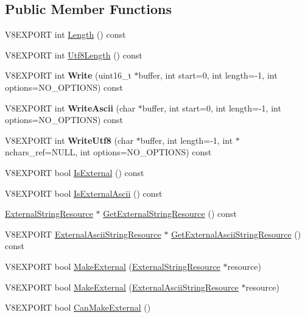 \subsection*{Public Member Functions}
\begin{DoxyCompactItemize}
\item 
V8\+E\+X\+P\+O\+R\+T int \hyperlink{classv8_1_1_string_a812edd5c3beffb3a08ff94103ac31f23}{Length} () const 
\item 
V8\+E\+X\+P\+O\+R\+T int \hyperlink{classv8_1_1_string_a11d12cdcd49afe5a8bb12646fd8ec17a}{Utf8\+Length} () const 
\item 
\hypertarget{classv8_1_1_string_acb1144b0652bc44345bf2d52b1455c05}{}V8\+E\+X\+P\+O\+R\+T int {\bfseries Write} (uint16\+\_\+t $\ast$buffer, int start=0, int length=-\/1, int options=N\+O\+\_\+\+O\+P\+T\+I\+O\+N\+S) const \label{classv8_1_1_string_acb1144b0652bc44345bf2d52b1455c05}

\item 
\hypertarget{classv8_1_1_string_af60c183b13ca1caebc7ea5d4bde593e6}{}V8\+E\+X\+P\+O\+R\+T int {\bfseries Write\+Ascii} (char $\ast$buffer, int start=0, int length=-\/1, int options=N\+O\+\_\+\+O\+P\+T\+I\+O\+N\+S) const \label{classv8_1_1_string_af60c183b13ca1caebc7ea5d4bde593e6}

\item 
\hypertarget{classv8_1_1_string_ae8dca2507fe29952310f6ed65bcb58a4}{}V8\+E\+X\+P\+O\+R\+T int {\bfseries Write\+Utf8} (char $\ast$buffer, int length=-\/1, int $\ast$nchars\+\_\+ref=N\+U\+L\+L, int options=N\+O\+\_\+\+O\+P\+T\+I\+O\+N\+S) const \label{classv8_1_1_string_ae8dca2507fe29952310f6ed65bcb58a4}

\item 
V8\+E\+X\+P\+O\+R\+T bool \hyperlink{classv8_1_1_string_a945ba040efb2bffb14c04eda492767ac}{Is\+External} () const 
\item 
V8\+E\+X\+P\+O\+R\+T bool \hyperlink{classv8_1_1_string_a1b136ebc0ac30df9357e09b5486ca0a3}{Is\+External\+Ascii} () const 
\item 
\hyperlink{classv8_1_1_string_1_1_external_string_resource}{External\+String\+Resource} $\ast$ \hyperlink{classv8_1_1_string_a1a78c6fe39dbdd6322ca576e224f0cba}{Get\+External\+String\+Resource} () const 
\item 
V8\+E\+X\+P\+O\+R\+T \hyperlink{classv8_1_1_string_1_1_external_ascii_string_resource}{External\+Ascii\+String\+Resource} $\ast$ \hyperlink{classv8_1_1_string_a4b1245ec290ee25ee64c803fc85693d7}{Get\+External\+Ascii\+String\+Resource} () const 
\item 
V8\+E\+X\+P\+O\+R\+T bool \hyperlink{classv8_1_1_string_a6419e6b87e73bf03e326dd862fdca495}{Make\+External} (\hyperlink{classv8_1_1_string_1_1_external_string_resource}{External\+String\+Resource} $\ast$resource)
\item 
V8\+E\+X\+P\+O\+R\+T bool \hyperlink{classv8_1_1_string_ad1970efe9119a63f667c4acbdccda424}{Make\+External} (\hyperlink{classv8_1_1_string_1_1_external_ascii_string_resource}{External\+Ascii\+String\+Resource} $\ast$resource)
\item 
V8\+E\+X\+P\+O\+R\+T bool \hyperlink{classv8_1_1_string_ac24779f37e73d8af36092cca294804c3}{Can\+Make\+External} ()
\end{DoxyCompactItemize}
